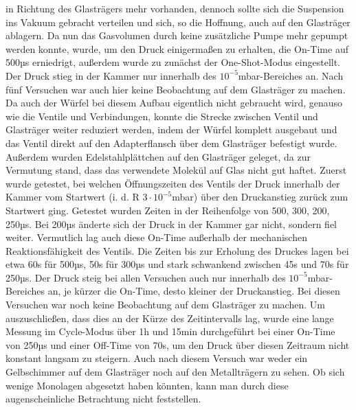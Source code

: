 in Richtung des Glasträgers mehr vorhanden, dennoch sollte sich die Suspension ins Vakuum gebracht
verteilen und sich, so die Hoffnung, auch auf den Glasträger ablagern. Da nun das Gasvolumen durch
keine zusätzliche Pumpe mehr gepumpt werden konnte, wurde, um den Druck einigermaßen zu erhalten,
die On-Time auf 500µs erniedrigt, außerdem wurde zu zunächst der One-Shot-Modus eingestellt. Der
Druck stieg in der Kammer nur innerhalb des $10^{-5}$mbar-Bereiches an. Nach fünf Versuchen war auch
hier keine Beobachtung auf dem Glasträger zu machen. \\
Da auch der Würfel bei diesem Aufbau eigentlich nicht gebraucht wird, genauso wie die Ventile und
Verbindungen, konnte die Strecke zwischen Ventil und Glasträger weiter reduziert werden, indem der
Würfel komplett ausgebaut und das Ventil direkt auf den Adapterflansch über dem Glasträger befestigt
wurde. Außerdem wurden Edelstahlplättchen auf den
Glasträger geleget, da zur Vermutung stand, dass
das verwendete Molekül auf Glas nicht gut haftet.
Zuerst wurde getestet, bei welchen
Öffnungszeiten des Ventils der Druck innerhalb der Kammer vom Startwert (i. d. R $3\cdot10^{-5}$mbar) über den Druckanstieg zurück zum Startwert ging. Getestet wurden Zeiten in der Reihenfolge von 500, 300, 200, 250µs. Bei 200µs änderte sich der Druck in der Kammer gar nicht, sondern fiel weiter. Vermutlich lag auch diese On-Time außerhalb der mechanischen Reaktionsfähigkeit des Ventils. Die Zeiten bis zur
Erholung des Druckes lagen bei etwa 60s für 500µs, 50s für 300µs und stark schwankend zwischen 45s
und 70s für 250µs. Der Druck steig bei allen Versuchen auch nur innerhalb des
$10^{-5}$mbar-Bereiches an, je kürzer die On-Time, desto kleiner der Druckanstieg. Bei diesen
Versuchen war noch keine Beobachtung auf dem Glasträger zu machen. Um auszuschließen, dass dies an
der Kürze des Zeitintervalls lag, wurde eine lange Messung im Cycle-Modus über 1h und 15min
durchgeführt bei einer On-Time von 250µs und einer Off-Time von 70s, um den Druck über diesen
Zeitraum nicht konstant langsam zu steigern. Auch nach diesem Versuch war weder ein Gelbschimmer
auf dem Glasträger noch auf den Metallträgern zu sehen. Ob sich wenige Monolagen abgesetzt haben könnten, kann man durch diese
augenscheinliche Betrachtung nicht feststellen.\\

































